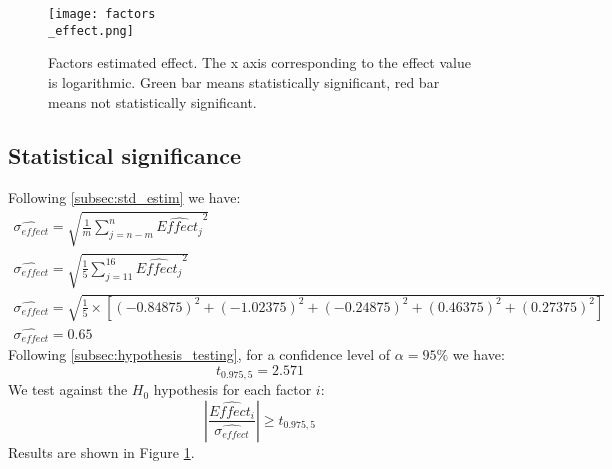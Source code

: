 \documentclass{article}
\begin{document}
\begin{figure}[!ht]
    \centering
    \texttt{[image: factors\\\_effect.png]}
    \caption{Factors estimated effect. The x axis corresponding to the effect value is logarithmic. Green bar means statistically significant, red bar means not statistically significant.}
    \label{fig:factors_effect}
\end{figure}

\subsection{Statistical significance}

Following \ref{subsec:std_estim} we have:
\begin{gather}
    \widehat{\sigma_{effect}} = \sqrt{\frac{1}{m} \sum_{j=n-m}^{n} \widehat{Effect_j}^2} \\
    \widehat{\sigma_{effect}} = \sqrt{\frac{1}{5} \sum_{j=11}^{16} \widehat{Effect_j}^2} \\
    \widehat{\sigma_{effect}} = \sqrt{\frac{1}{5}\times\left[
            \left(-0.84875\right)^2
            + \left(-1.02375\right)^2
            + \left(-0.24875\right)^2
            + \left(0.46375\right)^2
            + \left(0.27375\right)^2
            \right]}                                                                             \\
    \widehat{\sigma_{effect}} = 0.65
\end{gather}
Following \ref{subsec:hypothesis_testing}, for a confidence level of $\alpha=95\%$ we have:
\begin{equation}
    t_{0.975, 5} = 2.571
\end{equation}
We test against the $H_0$ hypothesis for each factor $i$:
\begin{equation}
    \left| \frac{\widehat{Effect_i}}{\widehat{\sigma_{effect}}} \right| \geq t_{0.975, 5}
\end{equation}
Results are shown in Figure \ref{fig:factors_effect}.
\end{document}
